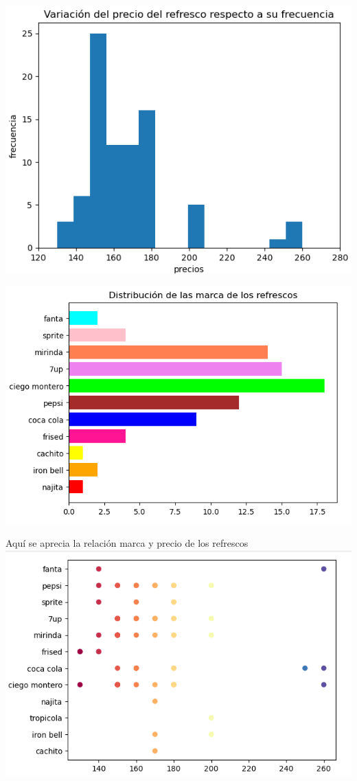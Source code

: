 \documentclass{beamer}
\begin{document}
\begin{frame}
    \includegraphics[scale=0.5]{precio de refresco.png}
    \end{frame}

\begin{frame}
    \includegraphics[scale=0.5]{marca de refresco.png}
    \end{frame}    

\begin{frame}
    Aquí se aprecia la relación marca y precio de los refrescos
    \includegraphics[scale=0.5]{marca y precio de refresco.png}
    \end{frame}    
\end{document}
